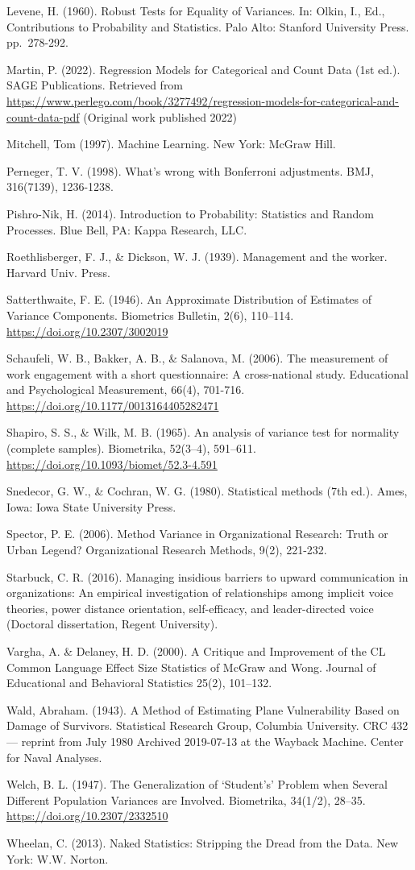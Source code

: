 \documentclass[
]{book}
\begin{document}
Levene, H. (1960). Robust Tests for Equality of Variances. In: Olkin, I., Ed., Contributions to Probability and Statistics. Palo Alto: Stanford University Press. pp.~278-292.

Martin, P. (2022). Regression Models for Categorical and Count Data (1st ed.). SAGE Publications. Retrieved from \url{https://www.perlego.com/book/3277492/regression-models-for-categorical-and-count-data-pdf} (Original work published 2022)

Mitchell, Tom (1997). Machine Learning. New York: McGraw Hill.

Perneger, T. V. (1998). What's wrong with Bonferroni adjustments. BMJ, 316(7139), 1236-1238.

Pishro-Nik, H. (2014). Introduction to Probability: Statistics and Random Processes. Blue Bell, PA: Kappa Research, LLC.

Roethlisberger, F. J., \& Dickson, W. J. (1939). Management and the worker. Harvard Univ. Press.

Satterthwaite, F. E. (1946). An Approximate Distribution of Estimates of Variance Components. Biometrics Bulletin, 2(6), 110--114. \url{https://doi.org/10.2307/3002019}

Schaufeli, W. B., Bakker, A. B., \& Salanova, M. (2006). The measurement of work engagement with a short questionnaire: A cross-national study. Educational and Psychological Measurement, 66(4), 701-716. \url{https://doi.org/10.1177/0013164405282471}

Shapiro, S. S., \& Wilk, M. B. (1965). An analysis of variance test for normality (complete samples). Biometrika, 52(3--4), 591--611. \url{https://doi.org/10.1093/biomet/52.3-4.591}

Snedecor, G. W., \& Cochran, W. G. (1980). Statistical methods (7th ed.). Ames, Iowa: Iowa State University Press.

Spector, P. E. (2006). Method Variance in Organizational Research: Truth or Urban Legend? Organizational Research Methods, 9(2), 221-232.

Starbuck, C. R. (2016). Managing insidious barriers to upward communication in organizations: An empirical investigation of relationships among implicit voice theories, power distance orientation, self-efficacy, and leader-directed voice (Doctoral dissertation, Regent University).

Vargha, A. \& Delaney, H. D. (2000). A Critique and Improvement of the CL Common Language Effect Size Statistics of McGraw and Wong. Journal of Educational and Behavioral Statistics 25(2), 101--132.

Wald, Abraham. (1943). A Method of Estimating Plane Vulnerability Based on Damage of Survivors. Statistical Research Group, Columbia University. CRC 432 --- reprint from July 1980 Archived 2019-07-13 at the Wayback Machine. Center for Naval Analyses.

Welch, B. L. (1947). The Generalization of `Student's' Problem when Several Different Population Variances are Involved. Biometrika, 34(1/2), 28--35. \url{https://doi.org/10.2307/2332510}

Wheelan, C. (2013). Naked Statistics: Stripping the Dread from the Data. New York: W.W. Norton.

  
\end{document}

